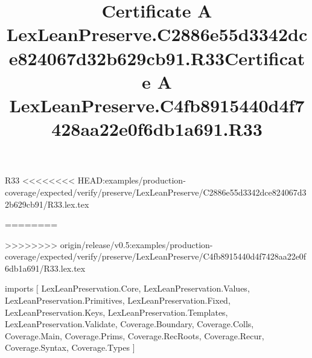 \begin{lexlean}{R33}
<<<<<<<< HEAD:examples/production-coverage/expected/verify/preserve/LexLeanPreserve/C2886e55d3342dce824067d32b629cb91/R33.lex.tex
\title{Certificate A LexLeanPreserve.C2886e55d3342dce824067d32b629cb91.R33}
========
\title{Certificate A LexLeanPreserve.C4fb8915440d4f7428aa22e0f6db1a691.R33}
>>>>>>>> origin/release/v0.5:examples/production-coverage/expected/verify/preserve/LexLeanPreserve/C4fb8915440d4f7428aa22e0f6db1a691/R33.lex.tex
\begin{coremodule}
imports [
  LexLeanPreservation.Core,
  LexLeanPreservation.Values,
  LexLeanPreservation.Primitives,
  LexLeanPreservation.Fixed,
  LexLeanPreservation.Keys,
  LexLeanPreservation.Templates,
  LexLeanPreservation.Validate,
  Coverage.Boundary,
  Coverage.Colls,
  Coverage.Main,
  Coverage.Prims,
  Coverage.RecRoots,
  Coverage.Recur,
  Coverage.Syntax,
  Coverage.Types
]


\end{coremodule}
\end{lexlean}
